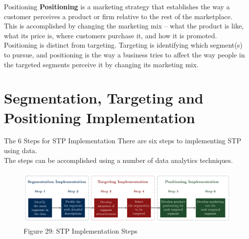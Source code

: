 \documentclass[pdf]{beamer}
\newcommand{\empr}[1]{{\color{franklinblue}\textbf{#1}}}
\theoremstyle{remark}
\theoremstyle{definition}
\begin{document}
\begin{frame}[t]{Positioning}
\empr{Positioning} is a marketing strategy that establishes the way a customer perceives a product or firm relative to the rest of the marketplace. \\
\vspace{1.5ex} 
This is accomplished by changing the marketing mix -- what the product is like, what its price is, where customers purchase it, and how it is promoted. \\
\vspace{1.5ex}
 Positioning is distinct from targeting. Targeting is identifying which segment(s) to pursue, and positioning is the way a business tries to affect the way people in the targeted segments perceive it by changing its marketing mix.
\end{frame}

\section{Segmentation, Targeting and Positioning Implementation}

\begin{frame}[t]{The 6 Steps for STP Implementation}
There are six steps to implementing STP using data. \\
\vspace{1.5ex}
The steps can be accomplished using a number of data analytics techniques.\\
 \vspace{0.0ex}
\begin{figure}[htbp]
  \captionsetup{justification=centering}
  \includegraphics[height=2.8cm, trim=1.0cm 0.0cm 0.0cm 0.0cm width=2.8cm]{STP_Process.pdf}
  \caption{Figure {\color{franklinblue} 29}: STP Implementation Steps}
\end{figure}
\end{frame}
\end{document}
